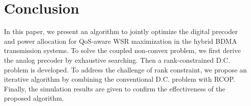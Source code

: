 \documentclass[10pt,journal,twocolumn,twoside]{IEEEtran}
\begin{document}
\section{Conclusion}
In this paper, we present an algorithm to jointly optimize the digital precoder and power allocation for QoS-aware WSR maximization in the hybrid BDMA transmission systems. To solve the coupled non-convex problem, we first derive the analog precoder by exhaustive searching. Then a rank-constrained D.C. problem is developed. To address the challenge of rank constraint, we propose an iterative algorithm by combining the conventional D.C. problem with RCOP. Finally, the simulation results are given to confirm the effectiveness of the proposed algorithm.





\end{document}
